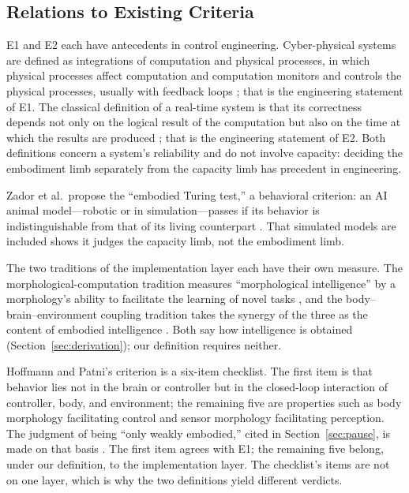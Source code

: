 \documentclass[10pt]{article}
\begin{document}
\subsection{Relations to Existing Criteria}\label{sec:relations}

E1 and E2 each have antecedents in control engineering. Cyber-physical systems are defined as integrations of computation and physical processes, in which physical processes affect computation and computation monitors and controls the physical processes, usually with feedback loops \cite{lee2008}; that is the engineering statement of E1. The classical definition of a real-time system is that its correctness depends not only on the logical result of the computation but also on the time at which the results are produced \cite{stankovic1988}; that is the engineering statement of E2. Both definitions concern a system's reliability and do not involve capacity: deciding the embodiment limb separately from the capacity limb has precedent in engineering.

Zador et al.\ propose the ``embodied Turing test,'' a behavioral criterion: an AI animal model---robotic or in simulation---passes if its behavior is indistinguishable from that of its living counterpart \cite{zador2023}. That simulated models are included shows it judges the capacity limb, not the embodiment limb.

The two traditions of the implementation layer each have their own measure. The morphological-computation tradition \cite{muller2017} measures ``morphological intelligence'' by a morphology's ability to facilitate the learning of novel tasks \cite{gupta2021}, and the body--brain--environment coupling tradition takes the synergy of the three as the content of embodied intelligence \cite{liu2025csur,pfeifer2007}. Both say how intelligence is obtained (Section~\ref{sec:derivation}); our definition requires neither.

Hoffmann and Patni's criterion is a six-item checklist. The first item is that behavior lies not in the brain or controller but in the closed-loop interaction of controller, body, and environment; the remaining five are properties such as body morphology facilitating control and sensor morphology facilitating perception. The judgment of being ``only weakly embodied,'' cited in Section~\ref{sec:pause}, is made on that basis \cite{hoffmann2025}. The first item agrees with E1; the remaining five belong, under our definition, to the implementation layer. The checklist's items are not on one layer, which is why the two definitions yield different verdicts.
\end{document}
